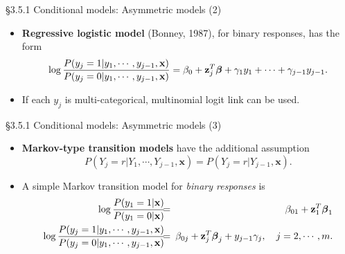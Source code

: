 \documentclass{beamer}
\newenvironment{wideitemize}%
  {\begin{itemize}%
    \setlength{\parskip}{1em}}%
  {\end{itemize}}
\begin{document}
\begin{frame}{\S3.5.1 Conditional models: Asymmetric models (2)}
\begin{wideitemize}
 \item
 \textbf{Regressive logistic model} (Bonney, 1987), for binary responses,  has the form
$$\log\frac{P(y_j=1|y_1,\cdots, y_{j-1}, \textbf{x})}{P(y_j=0|y_1,\cdots, y_{j-1},\textbf{x})} = \beta_{0} 
+\textbf{z}_j^T\mbox{\boldmath $\beta$}+\gamma_1 y_1+\cdots+\gamma_{j-1}y_{j-1}.$$



\item If each $y_j$ is multi-categorical, multinomial logit link can be used. 
\end{wideitemize}
\end{frame}

\begin{frame}{\S3.5.1 Conditional models: Asymmetric models (3)}
\begin{wideitemize}
\item
\textbf{Markov-type transition models} have  the additional assumption 
\[
P(Y_j=r|Y_1,\cdots, Y_{j-1},\textbf{x})=P(Y_j=r|Y_{j-1},\textbf{x}).
\]
\item
A simple Markov transition model for \textit{binary responses} is
\begin{eqnarray*}
\log\frac{P(y_1=1|\textbf{x})}{P(y_1=0|\textbf{x})}&\!\!\!=\!\!\!&\beta_{01}+\textbf{z}_1^T\mbox{\boldmath $\beta$}_1 \\
\log\frac{P(y_j=1|y_1,\cdots, y_{j-1}, \textbf{x})}{P(y_j=0|y_1,\cdots, y_{j-1},\textbf{x})} &\!\!\!=\!\!\!& \beta_{0j} 
+\textbf{z}_j^T\mbox{\boldmath $\beta$}_j+y_{j-1}\gamma_j, \quad j=2,\cdots, m.
\end{eqnarray*}


\end{wideitemize}
\end{frame}




%
%
%
%
%
%
%
%
%
\end{document}
